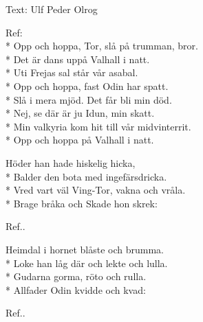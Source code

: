 \begin{SongText}
    \begin{SongInfo}
        Text: Ulf Peder Olrog
    \end{SongInfo}
    \begin{SongVerse}
        Ref:\\*%
        Opp och hoppa, Tor, slå på trumman, bror.\\*%
        Det är dans uppå Valhall i natt.\\*%
        Uti Frejas sal står vår asabal.\\*%
        Opp och hoppa, fast Odin har spatt.\\*%
        Slå i mera mjöd. Det får bli min död.\\*%
        Nej, se där är ju Idun, min skatt.\\*%
        Min valkyria kom hit till vår midvinterrit.\\*%
        Opp och hoppa på Valhall i natt.
    \end{SongVerse}
    \begin{SongVerse}
        Höder han hade hiskelig hicka,\\*%
        Balder den bota med ingefärsdricka.\\*%
        Vred vart väl Ving-Tor, vakna och vråla.\\*%
        Brage bråka och Skade hon skrek:
    \end{SongVerse}
    \begin{SongVerse}
        Ref..
    \end{SongVerse}
    \begin{SongVerse}
        Heimdal i hornet blåste och brumma.\\*%
        Loke han låg där och lekte och lulla.\\*%
        Gudarna gorma, röto och rulla.\\*%
        Allfader Odin kvidde och kvad:
    \end{SongVerse}
    \begin{SongVerse}
        Ref..
    \end{SongVerse}
\end{SongText}
